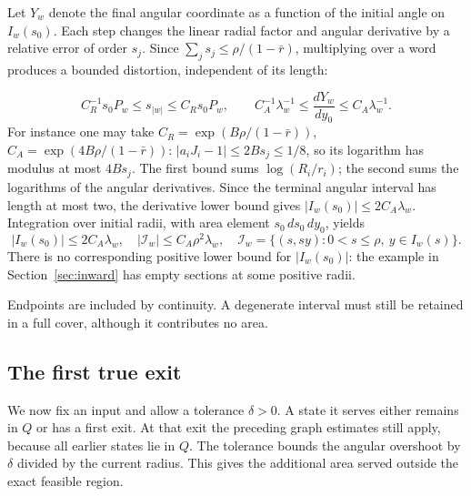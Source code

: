 \documentclass[11pt]{amsart}
\theoremstyle{definition}
\theoremstyle{remark}
\numberwithin{equation}{section}
\begin{document}
Let $Y_w$ denote the final angular coordinate as a function of the
initial angle on $I_w(s_0)$. Each step changes the linear radial
factor and angular derivative by a relative error of order $s_j$.
Since $\sum_j s_j\le\rho/(1-\bar r)$, multiplying over a word
produces a bounded distortion, independent of its length:

\begin{equation}
C_R^{-1}s_0P_w\le s_{|w|}
                  \le C_Rs_0P_w,\qquad
 C_A^{-1}\lambda_w^{-1}\le \frac{dY_w}{dy_0}
                  \le C_A\lambda_w^{-1}.                    \label{eq:products}
\end{equation}
For instance one may take
\(C_R=\exp(B\rho/(1-\bar r))\),
\(C_A=\exp(4B\rho/(1-\bar r))\):
\(|a_iJ_i-1|\le2Bs_j\le1/8\), so its logarithm has modulus at
most \(4Bs_j\). The first bound sums $\log(R_i/r_i)$; the second sums the
logarithms of the angular derivatives. Since the terminal angular
interval has length at most two, the derivative lower bound gives
$|I_w(s_0)|\le2C_A\lambda_w$. Integration over initial radii,
with area element $s_0\,ds_0\,dy_0$, yields
\begin{equation}
|I_w(s_0)|\le2C_A\lambda_w,
 \quad |\mathcal I_w|\le C_A\rho^2\lambda_w,
 \quad \mathcal I_w=\{(s,sy):0<s\le\rho,\ y\in I_w(s)\}.      \label{eq:striparea}
\end{equation}
There is no corresponding positive lower bound for
$|I_w(s_0)|$: the example in Section~\ref{sec:inward} has empty
sections at some positive radii.

Endpoints are included by continuity. A degenerate interval must
still be retained in a full cover, although it contributes no area.
\subsection{The first true exit}
We now fix an input and allow a tolerance $\delta>0$.
A state it serves either remains in $Q$ or has a first exit.
At that exit the preceding graph estimates still apply, because
all earlier states lie in $Q$. The tolerance bounds the angular
overshoot by $\delta$ divided by the current radius. This gives
the additional area served outside the exact feasible region.
\end{document}

